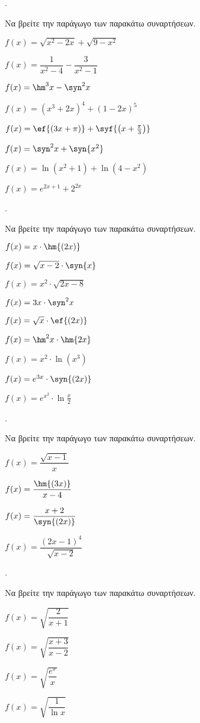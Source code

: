 \documentclass[11pt,a4paper,twocolumn]{article}
\newcounter{askhsh}
\newcommand{\askhsh}{{\large\theaskhsh.}\ \addtocounter{askhsh}{1}}
\begin{document}
\askhsh Να βρείτε την παράγωγο των παρακάτω συναρτήσεων.
\begin{alist}
\item $ f(x)=\sqrt{x^2-2x}+\sqrt{9-x^2} $
\item $ f(x)=\dfrac{1}{x^2-4}-\dfrac{3}{x^2-1} $
\item $ f(x)=\hm^3{x}-\syn^2{x} $
\item $ f(x)=(x^3+2x)^4+(1-2x)^5 $
\item $ f(x)=\ef{\left(3x+\pi\right)}+\syf{\left(x+\frac{\pi}{3}\right)} $
\item $ f(x)=\syn^2{x}+\syn{x^2} $
\item $ f(x)=\ln{\left(x^2+1\right)+\ln{\left(4-x^2\right)}}$
\item $ f(x)=e^{2x+1}+2^{2x}$
\end{alist}
\askhsh Να βρείτε την παράγωγο των παρακάτω συναρτήσεων.
\begin{alist}
\item $ f(x)=x\cdot\hm{(2x)} $
\item $ f(x)=\sqrt{x-2}\cdot\syn{x} $
\item $ f(x)=x^2\cdot\sqrt{2x-8} $
\item $ f(x)=3x\cdot\syn^2{x} $
\item $ f(x)=\sqrt{x}\cdot\ef{(2x)} $
\item $ f(x)=\hm^2{x}\cdot\hm{2x} $
\item $ f(x)=x^2\cdot\ln{\left(x^3\right)}$
\item $ f(x)=e^{3x}\cdot\syn{(2x)}$
\item $ f(x)=e^{x^2}\cdot\ln{\frac{x}{2}}$
\end{alist}
\askhsh Να βρείτε την παράγωγο των παρακάτω συναρτήσεων.
\begin{multicols}{2}
\begin{alist}
\item $ f(x)=\dfrac{\sqrt{x-1}}{x} $
\item $ f(x)=\dfrac{\hm{(3x)}}{x-4} $
\item $ f(x)=\dfrac{x+2}{\syn{(2x)}} $
\item $ f(x)=\dfrac{(2x-1)^4}{\sqrt{x-2}} $
\end{alist}
\end{multicols}
\askhsh Να βρείτε την παράγωγο των παρακάτω συναρτήσεων.
\begin{multicols}{2}
\begin{alist}
\item $ f(x)=\sqrt{\dfrac{2}{x+1}} $
\item $ f(x)=\sqrt{\dfrac{x+3}{x-2}} $
\item $ f(x)=\sqrt{\dfrac{e^x}{x}} $
\item $ f(x)=\sqrt{\dfrac{1}{\ln{x}}} $
\end{alist}
\end{multicols}
\end{document}
